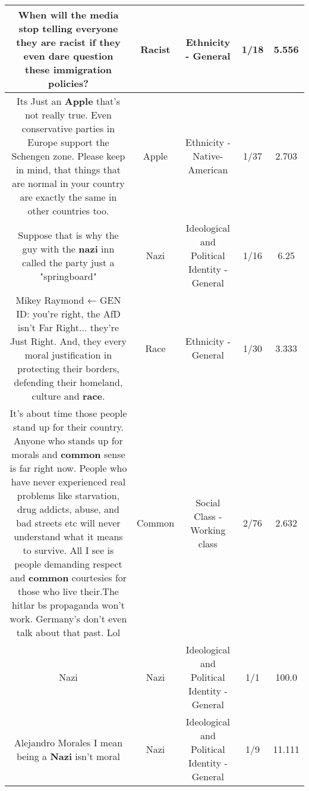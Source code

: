 \documentclass[11pt]{article}
\newlength\mylength
\begin{document}
\begin{center}
\begin{longtable}{|C{.65\mylength}|C{.30\mylength}|C{.12\mylength}|C{.12\mylength}|C{.12\mylength}|}
  \small When will the media stop telling everyone they are \textbf{racist} if they even dare question these immigration policies?\normalsize   & Racist & Ethnicity - General & 1/18 & 5.556 \\  \hline
  \small Its Just an \textbf{Apple} that's not really true. Even conservative parties in Europe support the Schengen zone. Please keep in mind, that things that are normal in your country are exactly the same in other countries too.\normalsize   & Apple & Ethnicity - Native-American & 1/37 & 2.703 \\  \hline
  \small Suppose that is why the guy with the \textbf{nazi} inn called the party just a "springboard"\normalsize   & Nazi &  Ideological and Political Identity - General & 1/16 & 6.25 \\  \hline
  \small Mikey Raymond ← GEN ID: you're right, the AfD isn't Far Right... they're Just Right.  And, they every moral justification in protecting their borders, defending their homeland, culture and \textbf{race}.\normalsize   & Race & Ethnicity - General & 1/30 & 3.333 \\  \hline
  \small It's about time those people stand up for their country. Anyone who stands up for morals and \textbf{common} sense is far right now. People who have never experienced real problems like starvation, drug addicts, abuse, and bad streets etc will never understand what it means to survive. All I see is people demanding respect and \textbf{common} courtesies for those who live their.The hitlar bs propaganda won't work. Germany's don't even talk about that past. Lol\normalsize   & Common & Social Class - Working class & 2/76 & 2.632 \\  \hline
  \small Nazi\normalsize   & Nazi &  Ideological and Political Identity - General & 1/1 & 100.0 \\  \hline
  \small Alejandro Morales I mean being a \textbf{Nazi} isn't moral\normalsize   & Nazi &  Ideological and Political Identity - General & 1/9 & 11.111 \\  \hline

\end{longtable}
\end{center}
\end{document}
